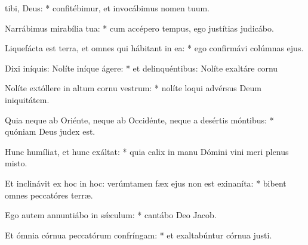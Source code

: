 \begin{psalmus}
    
     tibi, Deus: * confitébimur, et invocábimus nomen tuum.
    
    Narrábimus mirabília tua: * cum accépero tempus, ego justítias judicábo.
    
    Liquefácta est terra, et omnes qui hábitant in ea: * ego confirmávi colúmnas ejus.
    
    Dixi iníquis: Nolíte iníque ágere: * et delinquéntibus: Nolíte exaltáre cornu
    
    Nolíte extóllere in altum cornu vestrum: * nolíte loqui advérsus Deum iniquitátem.
    
    Quia neque ab Oriénte, neque ab Occidénte, neque a desértis móntibus: * quóniam Deus judex est.
    
    Hunc humíliat, et hunc exáltat: * quia calix in manu Dómini vini meri plenus misto.
    
    Et inclinávit ex hoc in hoc: verúmtamen fæx ejus non est exinaníta: * bibent omnes peccatóres terræ.
    
    Ego autem annuntiábo in sǽculum: * cantábo Deo Jacob.
    
    Et ómnia córnua peccatórum confríngam: * et exaltabúntur córnua justi.
    
    \end{psalmus}
